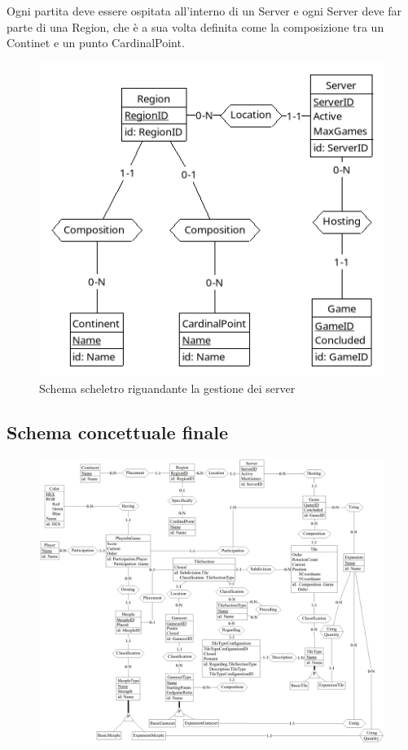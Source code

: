 Ogni partita deve essere ospitata all'interno di un Server e ogni Server deve far parte di una Region, che è a sua volta definita come la composizione tra un Continet e un punto CardinalPoint.

\begin{figure}[ht]
    \centering\includegraphics[scale=0.45]{images/Progettazione/Concettuale/Scheletro4.png}
    \caption{Schema scheletro riguandante la gestione dei server}
\end{figure}

\subsection{Schema concettuale finale}
\clearpage
\begin{figure}[ht]
    \centerline{\includegraphics[scale=0.52]{images/Progettazione/Concettuale/modello.png}}
\end{figure}